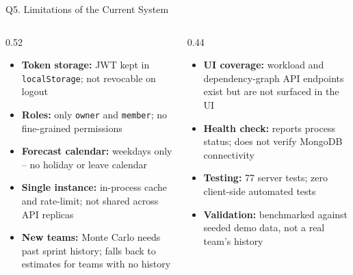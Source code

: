 \documentclass[11pt,aspectratio=169]{beamer}
\begin{document}
\begin{frame}{Q5. Limitations of the Current System}
  \begin{columns}[T]
    \begin{column}{0.52\textwidth}
      \begin{itemize}\small
        \item \textbf{Token storage:} JWT kept in \texttt{localStorage}; not revocable on logout
        \item \textbf{Roles:} only \texttt{owner} and \texttt{member}; no fine-grained permissions
        \item \textbf{Forecast calendar:} weekdays only -- no holiday or leave calendar
        \item \textbf{Single instance:} in-process cache and rate-limit; not shared across API replicas
        \item \textbf{New teams:} Monte Carlo needs past sprint history; falls back to estimates for teams with no history
      \end{itemize}
    \end{column}
    \begin{column}{0.44\textwidth}
      \begin{itemize}\small
        \item \textbf{UI coverage:} workload and dependency-graph API endpoints exist but are not surfaced in the UI
        \item \textbf{Health check:} reports process status; does not verify MongoDB connectivity
        \item \textbf{Testing:} 77 server tests; zero client-side automated tests
        \item \textbf{Validation:} benchmarked against seeded demo data, not a real team's history
      \end{itemize}
    \end{column}
  \end{columns}
\end{frame}
\end{document}
